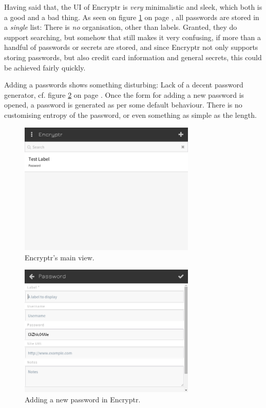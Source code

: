 			Having said that, the UI of Encryptr is \emph{very} minimalistic and sleek, which both is a good and a bad thing. As seen on figure \ref{fig:encryptr_main} on page \pageref{fig:encryptr_main}, all passwords are stored in a \emph{single} list: There is \emph{no} organisation, other than labels. Granted, they do support searching, but somehow that still makes it very confusing, if more than a handful of passwords or secrets are stored, and since Encryptr not only supports storing passwords, but also credit card information and general secrets, this could be achieved fairly quickly.

			Adding a passwords shows something disturbing: Lack of a decent password generator, cf. figure \ref{fig:encryptr_newpassword} on page \pageref{fig:encryptr_newpassword}. Once the form for adding a new password is opened, a password is generated as per some default behaviour. There is no customising entropy of the password, or even something as simple as the length.

			\begin{figure}[h!]
				\centering
				\includegraphics[width=0.75\textwidth]{figures/analysis/encryptr_main.png}
				\caption{Encryptr's main view.}
				\label{fig:encryptr_main}
			\end{figure}


			\begin{figure}[h!]
				\centering
				\includegraphics[width=0.75\textwidth]{figures/analysis/encryptr_newpassword_main.png}
				\caption{Adding a new password in Encryptr.}
				\label{fig:encryptr_newpassword}
			\end{figure}

